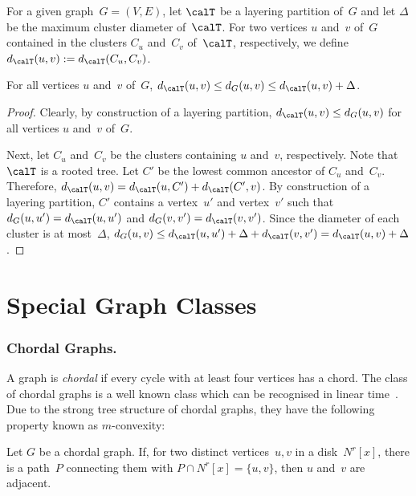 For a given graph~$G = (V, E)$, let $\calT$ be a layering partition of~$G$ and let $\Delta$ be the maximum cluster diameter of~$\calT$.
For two vertices $u$ and~$v$ of~$G$ contained in the clusters $C_u$ and~$C_v$ of~$\calT$, respectively, we define $d_\calT(u, v) := d_\calT(C_u, C_v)$.

\begin{lemma}
    \label{lem:LayPartVertDist}
For all vertices $u$ and~$v$ of~$G$, $d_\calT(u, v) \leq d_G(u, v) \leq d_\calT(u, v) + \Delta$.
\end{lemma}

\begin{proof}
Clearly, by construction of a layering partition, $d_{\calT}(u, v) \leq d_G(u, v)$ for all vertices $u$ and~$v$ of~$G$.

Next, let $C_u$ and~$C_v$ be the clusters containing $u$ and~$v$, respectively.
Note that $\calT$ is a rooted tree.
Let $C'$ be the lowest common ancestor of $C_u$ and~$C_v$.
Therefore, $d_\calT(u, v) = d_\calT(u, C') + d_\calT(C', v)$.
By construction of a layering partition, $C'$ contains a vertex~$u'$ and vertex~$v'$ such that $d_G(u, u') = d_\calT(u, u')$ and $d_G(v, v') = d_\calT(v, v')$.
Since the diameter of each cluster is at most~$\Delta$, $d_G(u, v) \leq d_\calT(u, u') + \Delta + d_\calT(v, v') = d_{\calT}(u, v) + \Delta$.
\end{proof}

\section{Special Graph Classes}

\subsubsection{Chordal Graphs.}
A graph is \emph{chordal} if every cycle with at least four vertices has a chord.
The class of chordal graphs is a well known class which can be recognised in linear time~\cite{TarjanYannak1984}.
Due to the strong tree structure of chordal graphs, they have the following property
known as $m$-convexity:

\begin{lemma}
     \label{lem:ChordalMConvex}
Let \( G \) be a chordal graph.
If, for two distinct vertices~\( u,v \) in a disk~\( N^r[x] \), there is a path~\( P \) connecting them with \( P \cap N^r[x] = \{ u, v \} \), then \( u \) and~\( v \) are adjacent.
\end{lemma}

